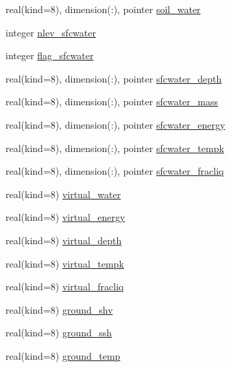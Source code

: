 \begin{DoxyCompactItemize}
\item 
real(kind=8), dimension(\+:), pointer \hyperlink{structrk4__coms_1_1rk4patchtype_aeb9d5fbd131ed7efcf9b750704de0bdb}{soil\+\_\+water}
\item 
integer \hyperlink{structrk4__coms_1_1rk4patchtype_adc5144790cd2799dcfaa4e0db370780a}{nlev\+\_\+sfcwater}
\item 
integer \hyperlink{structrk4__coms_1_1rk4patchtype_abdc62babe20bbe6f44149208d4c2b3f2}{flag\+\_\+sfcwater}
\item 
real(kind=8), dimension(\+:), pointer \hyperlink{structrk4__coms_1_1rk4patchtype_a1e8f967d8996d529643634d962f6c127}{sfcwater\+\_\+depth}
\item 
real(kind=8), dimension(\+:), pointer \hyperlink{structrk4__coms_1_1rk4patchtype_a4bc4d58a09ed1480c9782eb551854efb}{sfcwater\+\_\+mass}
\item 
real(kind=8), dimension(\+:), pointer \hyperlink{structrk4__coms_1_1rk4patchtype_adc098c3ac1a96cfc2bef87f348a06e52}{sfcwater\+\_\+energy}
\item 
real(kind=8), dimension(\+:), pointer \hyperlink{structrk4__coms_1_1rk4patchtype_a723d9da89575c897c20ddb0cb2c332ad}{sfcwater\+\_\+tempk}
\item 
real(kind=8), dimension(\+:), pointer \hyperlink{structrk4__coms_1_1rk4patchtype_a8462444e7b9040801b6b50e28fe2db4e}{sfcwater\+\_\+fracliq}
\item 
real(kind=8) \hyperlink{structrk4__coms_1_1rk4patchtype_afb1cdf0ac86fbe1120a9f389fca2585f}{virtual\+\_\+water}
\item 
real(kind=8) \hyperlink{structrk4__coms_1_1rk4patchtype_a7d974671aa3bf3b2a3189e6380479a84}{virtual\+\_\+energy}
\item 
real(kind=8) \hyperlink{structrk4__coms_1_1rk4patchtype_a4bb12d3aad94ab7dee728456152620b3}{virtual\+\_\+depth}
\item 
real(kind=8) \hyperlink{structrk4__coms_1_1rk4patchtype_ae85ac1bec1ba7e7791e362db703101d4}{virtual\+\_\+tempk}
\item 
real(kind=8) \hyperlink{structrk4__coms_1_1rk4patchtype_a42c9e2a1de2b0cce8f6adba1ef236f03}{virtual\+\_\+fracliq}
\item 
real(kind=8) \hyperlink{structrk4__coms_1_1rk4patchtype_a9d82c2b8d82b89c29d7099355de82d22}{ground\+\_\+shv}
\item 
real(kind=8) \hyperlink{structrk4__coms_1_1rk4patchtype_a4a1d3ae320be05ec4fe01c036377b65e}{ground\+\_\+ssh}
\item 
real(kind=8) \hyperlink{structrk4__coms_1_1rk4patchtype_ae99232f03e4425fe3bcc96fe1ba4d965}{ground\+\_\+temp}

\end{DoxyCompactItemize}
